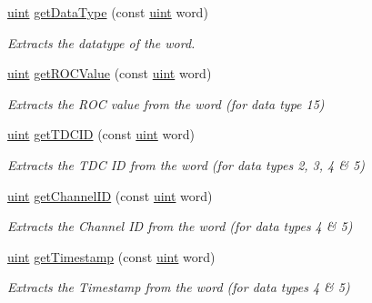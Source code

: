 \begin{DoxyCompactItemize}
\item 
\hyperlink{namespacebindec_a61700e6ffcfc677215bfdf223803e735}{uint} \hyperlink{namespacebindec_a7a98adfd04c65f870f74a423bfd744fe}{get\+Data\+Type} (const \hyperlink{namespacebindec_a61700e6ffcfc677215bfdf223803e735}{uint} word)
\begin{DoxyCompactList}\small\item\em Extracts the datatype of the word. \end{DoxyCompactList}\item 
\hyperlink{namespacebindec_a61700e6ffcfc677215bfdf223803e735}{uint} \hyperlink{namespacebindec_abfc242c82f0a7301671ec270bce57681}{get\+R\+O\+C\+Value} (const \hyperlink{namespacebindec_a61700e6ffcfc677215bfdf223803e735}{uint} word)
\begin{DoxyCompactList}\small\item\em Extracts the R\+OC value from the word (for data type 15) \end{DoxyCompactList}\item 
\hyperlink{namespacebindec_a61700e6ffcfc677215bfdf223803e735}{uint} \hyperlink{namespacebindec_a05afce2b4e8802eeb8b452bc1ec6de8b}{get\+T\+D\+C\+ID} (const \hyperlink{namespacebindec_a61700e6ffcfc677215bfdf223803e735}{uint} word)
\begin{DoxyCompactList}\small\item\em Extracts the T\+DC ID from the word (for data types 2, 3, 4 \& 5) \end{DoxyCompactList}\item 
\hyperlink{namespacebindec_a61700e6ffcfc677215bfdf223803e735}{uint} \hyperlink{namespacebindec_af1997af0743251d010780a8f728fcd7e}{get\+Channel\+ID} (const \hyperlink{namespacebindec_a61700e6ffcfc677215bfdf223803e735}{uint} word)
\begin{DoxyCompactList}\small\item\em Extracts the Channel ID from the word (for data types 4 \& 5) \end{DoxyCompactList}\item 
\hyperlink{namespacebindec_a61700e6ffcfc677215bfdf223803e735}{uint} \hyperlink{namespacebindec_ac7187bee4c7ad4848739d66e16a0f3e2}{get\+Timestamp} (const \hyperlink{namespacebindec_a61700e6ffcfc677215bfdf223803e735}{uint} word)
\begin{DoxyCompactList}\small\item\em Extracts the Timestamp from the word (for data types 4 \& 5) \end{DoxyCompactList}\item 

\end{DoxyCompactItemize}
